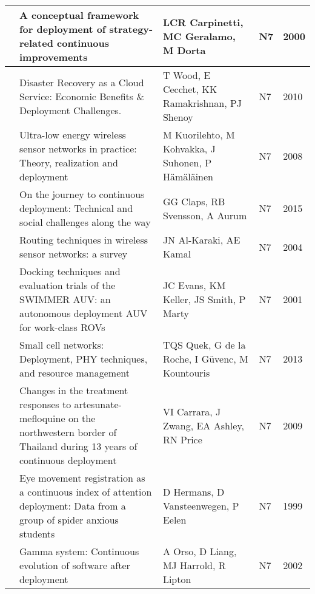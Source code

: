 \begin{landscape}
\begin{longtable}{|l|L{10cm}|L{10cm}|l|l|}
      & A conceptual framework for deployment of strategy-related continuous improvements & LCR Carpinetti, MC Geralamo, M Dorta & N7 & 2000 \\ \hline
    
     & Disaster Recovery as a Cloud Service: Economic Benefits \& Deployment Challenges. & T Wood, E Cecchet, KK Ramakrishnan, PJ Shenoy & N7 & 2010 \\ \hline
    
     &Ultra-low energy wireless sensor networks in practice: Theory, realization and deployment & M Kuorilehto, M Kohvakka, J Suhonen, P Hämäläinen & N7 & 2008 \\ \hline
    
      & On the journey to continuous deployment: Technical and social challenges along the way & GG Claps, RB Svensson, A Aurum & N7 & 2015 \\ \hline
    
     & Routing techniques in wireless sensor networks: a survey & JN Al-Karaki, AE Kamal & N7 & 2004 \\ \hline
    
     & Docking techniques and evaluation trials of the SWIMMER AUV: an autonomous deployment AUV for work-class ROVs
     & JC Evans, KM Keller, JS Smith, P Marty & N7 & 2001 \\ \hline
    
     & Small cell networks: Deployment, PHY techniques, and resource management & TQS Quek, G de la Roche, I Güvenc, M Kountouris & N7 & 2013 \\ \hline
    
     & Changes in the treatment responses to artesunate-mefloquine on the northwestern border of Thailand during 13 years of continuous deployment & VI Carrara, J Zwang, EA Ashley, RN Price & N7 & 2009 \\ \hline
    
     & Eye movement registration as a continuous index of attention deployment: Data from a group of spider anxious students & D Hermans, D Vansteenwegen, P Eelen & N7 & 1999 \\ \hline
    
     & Gamma system: Continuous evolution of software after deployment & A Orso, D Liang, MJ Harrold, R Lipton & N7 & 2002 \\ \hline
    

\end{longtable}
\end{landscape}
